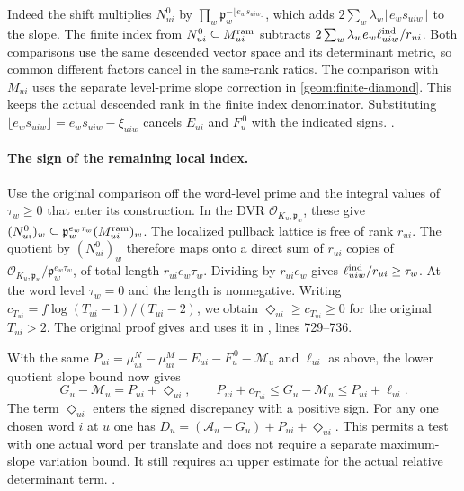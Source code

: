 Indeed the shift multiplies \(N^0_{ui}\) by
\(\prod_w\mathfrak p_w^{-\lfloor e_ws_{uiw}\rfloor}\), which adds
\(2\sum_w\lambda_w\lfloor e_ws_{uiw}\rfloor\) to the slope.
The finite index from \(N^0_{ui}\subseteq M^{\rm ram}_{ui}\)
subtracts \(2\sum_w\lambda_we_w\ell^{\rm ind}_{uiw}/r_{ui}\).
Both comparisons use the same descended vector space and its
determinant metric, so common different factors cancel in the
same-rank ratios. The comparison with \(M_{ui}\) uses the separate
level-prime slope correction in \eqref{geom:finite-diamond}. This
keeps the actual descended rank in the finite index denominator.
Substituting \(\lfloor e_ws_{uiw}\rfloor=e_ws_{uiw}-\xi_{uiw}\)
cancels \(E_{ui}\) and \(F_u^{\,0}\) with the indicated signs.
.

\paragraph{The sign of the remaining local index.}
Use the original  comparison off the word-level
prime and the integral values of \(\tau_w\ge0\) that enter its
construction. In the DVR \(\mathcal O_{K_u,\mathfrak p_w}\), these
give
\((N^0_{ui})_w\subseteq\mathfrak p_w^{e_w\tau_w}
(M^{\rm ram}_{ui})_w\). The localized pullback lattice is free of
rank \(r_{ui}\). The quotient by \((N^0_{ui})_w\) therefore maps onto
a direct sum of \(r_{ui}\) copies of
\(\mathcal O_{K_u,\mathfrak p_w}/\mathfrak p_w^{e_w\tau_w}\),
of total length \(r_{ui}e_w\tau_w\). Dividing by \(r_{ui}e_w\)
gives \(\ell^{\rm ind}_{uiw}/r_{ui}\ge\tau_w\).
At the word level \(\tau_w=0\) and the length is nonnegative.
Writing \(c_{T_{ui}}=f\log(T_{ui}-1)/(T_{ui}-2)\), we obtain
\(\Diamond_{ui}\ge c_{T_{ui}}\ge0\) for the original \(T_{ui}>2\).
The original proof gives
and uses it in , lines 729--736.

With the same \(P_{ui}=\mu^N_{ui}-\mu^M_{ui}+E_{ui}
-F_u^{\,0}-\mathcal M_u\) and \(\ell_{ui}\) as above, the lower
quotient slope bound now gives
\[
 G_u-\mathcal M_u=P_{ui}+\Diamond_{ui},\qquad
 P_{ui}+c_{T_{ui}}\le G_u-\mathcal M_u\le P_{ui}+\ell_{ui}.
\]
The term \(\Diamond_{ui}\) enters the signed discrepancy with a
positive sign. For any one chosen word \(i\) at \(u\) one has
\(D_u=(\mathcal A_u-G_u)+P_{ui}+\Diamond_{ui}\).
This permits a test with one actual word per translate and does not
require a separate maximum-slope variation bound. It still requires
an upper estimate for the actual relative determinant term.
.

